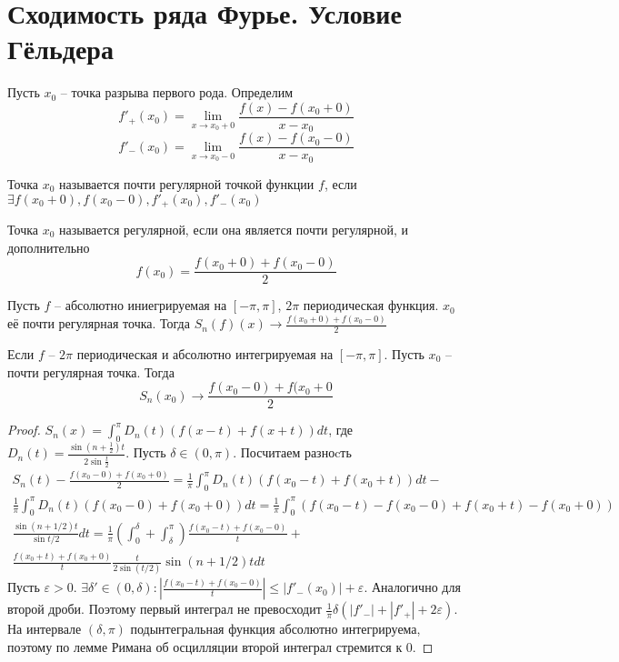 \documentclass[document.tex]{subfiles}
\begin{document}
\section{Сходимость ряда Фурье. Условие Гёльдера}
\begin{definition}
	Пусть $x_0$ -- точка разрыва первого рода. Определим
	$$f'_+(x_0) = \lim_{x \rightarrow x_0+0} \frac{f(x) - f(x_0+0)}{x-x_0}$$
	$$f'_-(x_0) = \lim_{x \rightarrow x_0-0} \frac{f(x) - f(x_0-0)}{x-x_0}$$
\end{definition}

\begin{definition}
	Точка $x_0$ называется почти регулярной точкой функции $f$, если $\exists f(x_0+0), f(x_0-0), f'_+(x_0), f'_-(x_0)$
\end{definition}

\begin{definition}
	Точка $x_0$ называется регулярной, если она является почти регулярной, и дополнительно $$f(x_0) = \frac{f(x_0+0) + f(x_0 -0)}{2}$$
\end{definition}

\begin{theorem}
	Пусть $f$ -- абсолютно иниегрируемая на $[-\pi, \pi]$, $2\pi$ периодическая функция. $x_0$ её почти регулярная точка. Тогда
	$S_n(f)(x) \rightarrow \frac{f(x_0+0)+f(x_0-0)}{2}$
\end{theorem}

\begin{theorem}
	Если $f$ -- $2 \pi$ периодическая и абсолютно интегрируемая на $[-\pi, \pi]$. Пусть $x_0$ -- почти регулярная точка. Тогда
	$$S_n(x_0) \rightarrow \frac{f(x_0 - 0) + f(x_0 + 0}{2}$$
\end{theorem}
\begin{proof}
	$S_n(x) = \int_{0}^{\pi} D_n(t) (f(x-t) + f(x+t)) dt$, где $D_n(t) = \frac{\sin (n+\frac{1}{2}) t}{2 \sin \frac{t}{2}}$.
	Пусть $\delta \in (0, \pi)$. Посчитаем разноcть
	\begin{multline*}
		S_n(t) - \frac{f(x_0 - 0) + f(x_0 + 0)}{2} = \frac{1}{\pi}\int_{0}^{\pi}D_n(t)(f(x_0 - t) + f(x_0 + t)) dt -\\
		\frac{1}{\pi} \int_{0}^{\pi}D_n(t) (f(x_0 - 0) + f(x_0 + 0)) dt = \frac{1}{\pi} \int_{0}^{\pi} (f(x_0 - t) -
        f(x_0 - 0) + f(x_0 + t) - f(x_0 + 0))\\
		\frac{\sin (n + 1/2)t}{\sin t/2} dt = \frac{1}{\pi} \left( \int_{0}^{\delta} + \int_{\delta}^{\pi} \right)  \frac{f(x_0 - t) + f(x_0 - 0)}{t} + \\
		\frac{f(x_0 + t) + f(x_0 + 0)}{t} \frac{t}{2 \sin(t/2)} \sin (n + 1/2) t dt
	\end{multline*}
	Пусть $\varepsilon > 0$. $\exists \delta' \in (0, \delta) : |\frac{f(x_0 - t) + f(x_0 - 0)}{t}| \leq |f'_-(x_0)| + \varepsilon$. Аналогично для второй дроби. Поэтому первый интеграл не превосходит $\frac{1}{\pi} \delta (|f'_-| + |f'_+| + 2 \varepsilon)$. На интервале $(\delta, \pi)$ подынтегральная функция абсолютно интегрируема, поэтому по лемме Римана об осцилляции второй интеграл стремится к 0.
\end{proof}
\end{document}
